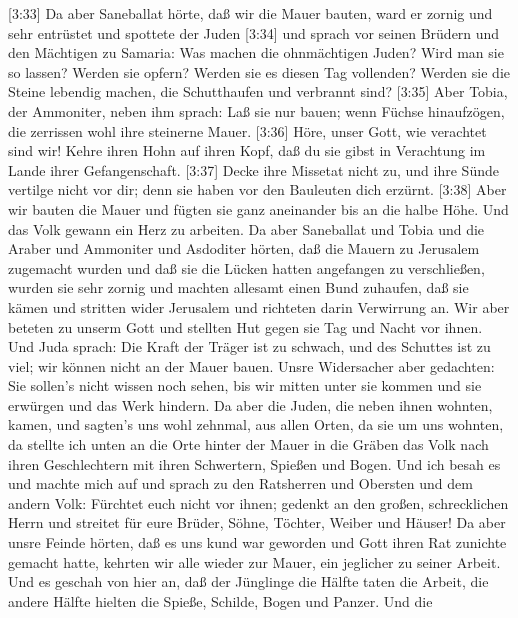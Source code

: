 {[}3:33{]} Da aber Saneballat hörte, daß wir die Mauer
bauten, ward er zornig und sehr entrüstet und spottete der Juden
 {[}3:34{]} und sprach vor seinen Brüdern und den Mächtigen
zu Samaria: Was machen die ohnmächtigen Juden? Wird man sie so lassen?
Werden sie opfern? Werden sie es diesen Tag vollenden? Werden sie die
Steine lebendig machen, die Schutthaufen und verbrannt sind?
 {[}3:35{]} Aber Tobia, der Ammoniter, neben ihm sprach: Laß
sie nur bauen; wenn Füchse hinaufzögen, die zerrissen wohl ihre
steinerne Mauer.  {[}3:36{]} Höre, unser Gott, wie verachtet
sind wir! Kehre ihren Hohn auf ihren Kopf, daß du sie gibst in
Verachtung im Lande ihrer Gefangenschaft.  {[}3:37{]} Decke
ihre Missetat nicht zu, und ihre Sünde vertilge nicht vor dir; denn sie
haben vor den Bauleuten dich erzürnt.  {[}3:38{]} Aber wir
bauten die Mauer und fügten sie ganz aneinander bis an die halbe Höhe.
Und das Volk gewann ein Herz zu arbeiten.  Da aber
Saneballat und Tobia und die Araber und Ammoniter und Asdoditer hörten,
daß die Mauern zu Jerusalem zugemacht wurden und daß sie die Lücken
hatten angefangen zu verschließen, wurden sie sehr zornig 
und machten allesamt einen Bund zuhaufen, daß sie kämen und stritten
wider Jerusalem und richteten darin Verwirrung an.  Wir aber
beteten zu unserm Gott und stellten Hut gegen sie Tag und Nacht vor
ihnen.  Und Juda sprach: Die Kraft der Träger ist zu
schwach, und des Schuttes ist zu viel; wir können nicht an der Mauer
bauen.  Unsre Widersacher aber gedachten: Sie sollen's
nicht wissen noch sehen, bis wir mitten unter sie kommen und sie
erwürgen und das Werk hindern.  Da aber die Juden, die
neben ihnen wohnten, kamen, und sagten's uns wohl zehnmal, aus allen
Orten, da sie um uns wohnten,  da stellte ich unten an die
Orte hinter der Mauer in die Gräben das Volk nach ihren Geschlechtern
mit ihren Schwertern, Spießen und Bogen.  Und ich besah es
und machte mich auf und sprach zu den Ratsherren und Obersten und dem
andern Volk: Fürchtet euch nicht vor ihnen; gedenkt an den großen,
schrecklichen Herrn und streitet für eure Brüder, Söhne, Töchter, Weiber
und Häuser!  Da aber unsre Feinde hörten, daß es uns kund
war geworden und Gott ihren Rat zunichte gemacht hatte, kehrten wir alle
wieder zur Mauer, ein jeglicher zu seiner Arbeit.  Und es
geschah von hier an, daß der Jünglinge die Hälfte taten die Arbeit, die
andere Hälfte hielten die Spieße, Schilde, Bogen und Panzer. Und die
